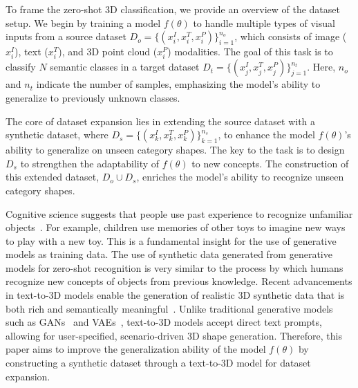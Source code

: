 To frame the zero-shot 3D classification, we provide an overview of the dataset setup. We begin by training a model $f(\theta)$ to handle multiple types of visual inputs from a source dataset $D_{o} = \{(x_i^I, x_i^T, x_i^P)\}_{i=1}^{n_o}$, which consists of image ($x_{i}^I$), text ($x_{i}^T$), and 3D point cloud ($x_{i}^P$) modalities. The goal of this task is to classify $N$ semantic classes in a target dataset $D_{t} = \{(x_j^I, x_j^T, x_j^P)\}_{j=1}^{n_t}$.
Here, $n_o$ and $n_t$ indicate the number of samples, emphasizing the model's ability to generalize to previously unknown classes.

The core of dataset expansion lies in extending the source dataset with a synthetic dataset, where $D_{s} = \{(x_k^I, x_k^T, x_k^P)\}_{k=1}^{n_s}$, to enhance the model $f(\theta)$'s ability to generalize on unseen category shapes. The key to the task is to design $D_{s}$ to strengthen the adaptability of $f(\theta)$ to new concepts. The construction of this extended dataset, $D_{o} \cup D_{s}$, enriches the model's ability to recognize unseen category shapes.

Cognitive science suggests that people use past experience to recognize unfamiliar objects~\cite{bar2004visual, kiani2007object}. For example, children use memories of other toys to imagine new ways to play with a new toy. 
This is a fundamental insight for the use of generative models as training data. The use of synthetic data generated from generative models for zero-shot recognition is very similar to the process by which humans recognize new concepts of objects from previous knowledge.
Recent advancements in text-to-3D models enable the generation of realistic 3D synthetic data that is both rich and semantically meaningful~\cite{nichol2022point, poole2022dreamfusion, lin2023magic3d, chen2023fantasia3d}. Unlike traditional generative models such as GANs~\cite{goodfellow2020generative} and VAEs~\cite{kingma2013auto}, text-to-3D models accept direct text prompts, allowing for user-specified, scenario-driven 3D shape generation. Therefore, this paper aims to improve the generalization ability of the model $f(\theta)$ by constructing a synthetic dataset through a text-to-3D model for dataset expansion.


